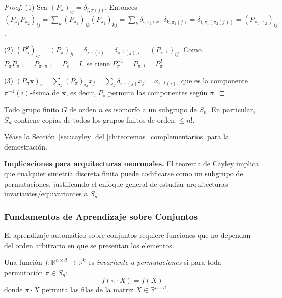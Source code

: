 \begin{proof}
(1) Sea $(P_\pi)_{ij} = \delta_{i, \pi(j)}$. Entonces $(P_{\pi_1} P_{\pi_2})_{ij} = \sum_k (P_{\pi_1})_{ik}(P_{\pi_2})_{kj} = \sum_k \delta_{i, \pi_1(k)} \delta_{k, \pi_2(j)} = \delta_{i, \pi_1(\pi_2(j))} = (P_{\pi_1 \cdot \pi_2})_{ij}$.

(2) $(P_\pi^T)_{ij} = (P_\pi)_{ji} = \delta_{j, \pi(i)} = \delta_{\pi^{-1}(j), i} = (P_{\pi^{-1}})_{ij}$. Como $P_\pi P_{\pi^{-1}} = P_{\pi \cdot \pi^{-1}} = P_e = I$, se tiene $P_\pi^{-1} = P_{\pi^{-1}} = P_\pi^T$.

(3) $(P_\pi \mathbf{x})_i = \sum_j (P_\pi)_{ij} x_j = \sum_j \delta_{i,\pi(j)} x_j = x_{\pi^{-1}(i)}$, que es la componente $\pi^{-1}(i)$-ésima de $\mathbf{x}$, es decir, $P_\pi$ permuta las componentes según $\pi$.
\end{proof}

\begin{theorem}\label{thm:cayley_symmetric}
Todo grupo finito $G$ de orden $n$ es isomorfo a un subgrupo de $S_n$. En particular, $S_n$ contiene copias de todos los grupos finitos de orden $\leq n!$.

Véase la Sección~\ref{sec:cayley} del \autoref{ch:teoremas_complementarios} para la demostración.
\end{theorem}

\textbf{Implicaciones para arquitecturas neuronales.} El teorema de Cayley implica que cualquier simetría discreta finita puede codificarse como un subgrupo de permutaciones, justificando el enfoque general de estudiar arquitecturas invariantes/equivariantes a $S_n$.

\subsubsection{Fundamentos de Aprendizaje sobre Conjuntos}

El aprendizaje automático sobre conjuntos requiere funciones que no dependan del orden arbitrario en que se presentan los elementos.

\begin{definition}\label{def:permutation_invariant_function}
Una función $f: \mathbb{R}^{n \times d} \to \mathbb{R}^k$ es \textit{invariante a permutaciones} si para toda permutación $\pi \in S_n$:
\begin{equation}
f(\pi \cdot X) = f(X)
\end{equation}
donde $\pi \cdot X$ permuta las filas de la matriz $X \in \mathbb{R}^{n \times d}$.
\end{definition}

